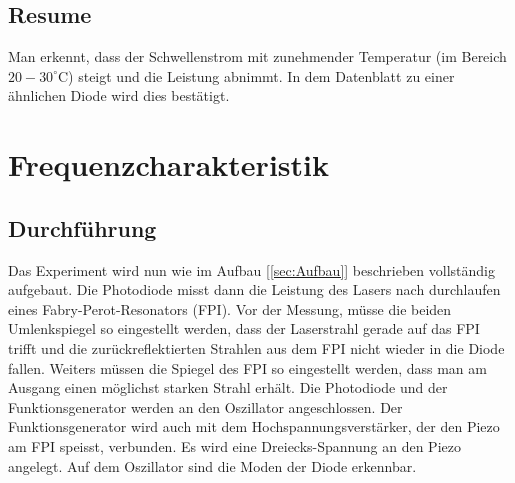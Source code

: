 \documentclass[a4paper,10pt]{scrartcl} %
\begin{document}
\subsection{Resume}
\label{subsec_Lesitung_Resume}
Man erkennt, dass der Schwellenstrom mit zunehmender Temperatur (im Bereich $20 - 30 ^\circ{\text{C}}$) steigt und die Leistung abnimmt. In dem Datenblatt zu einer ähnlichen Diode \cite{Diode} wird dies bestätigt.


\section{Frequenzcharakteristik}
\label{sec:Frequenzchar}

\subsection{Durchführung}
\label{subsec:Frequenz_Durchfuehrung}
Das Experiment wird nun wie im Aufbau [\ref{sec:Aufbau}] beschrieben vollständig aufgebaut. Die Photodiode misst dann die Leistung des Lasers nach durchlaufen eines Fabry-Perot-Resonators (FPI). Vor der Messung, müsse die beiden Umlenkspiegel so eingestellt werden, dass der Laserstrahl gerade auf das FPI trifft und die zurückreflektierten Strahlen aus dem FPI nicht wieder in die Diode fallen. Weiters müssen die Spiegel des FPI so eingestellt werden, dass man am Ausgang einen möglichst starken Strahl erhält. Die Photodiode und der Funktionsgenerator werden an den Oszillator angeschlossen. Der Funktionsgenerator wird auch mit dem Hochspannungsverstärker, der den Piezo am FPI speisst, verbunden. Es wird eine Dreiecks-Spannung an den Piezo angelegt. Auf dem Oszillator sind die Moden der Diode erkennbar.
\end{document}
